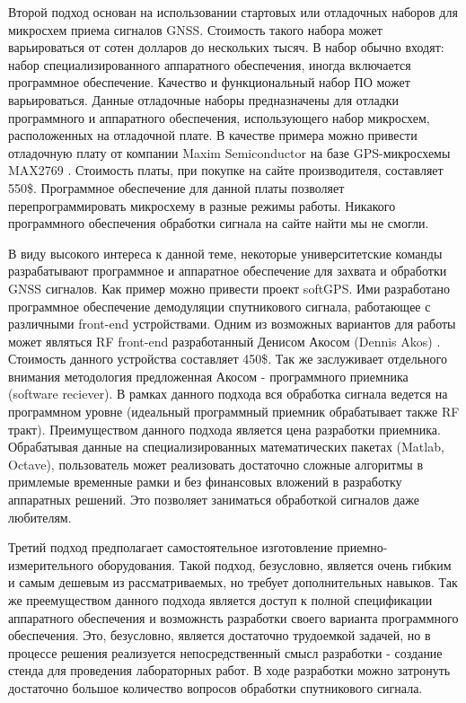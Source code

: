 \documentclass[a4paper,12pt]{article}
\numberwithin{table}{section}
\begin{document}
Второй подход основан на использовании стартовых или отладочных наборов для микросхем приема сигналов GNSS.
Стоимость такого набора может варьироваться от сотен долларов до нескольких тысяч.
В набор обычно входят: набор специализированного аппаратного обеспечения, иногда включается программное обеспечение.
Качество и функциональный набор ПО может варьироваться.
Данные отладочные наборы предназначены для отладки программного и аппаратного обеспечения, использующего набор
микросхем, расположенных на отладочной плате.
В качестве примера можно привести отладочную плату от компании Maxim Semiconductor на базе GPS-микросхемы MAX2769 \cite{max-evkit}.
Стоимость платы, при покупке на сайте производителя, составляет 550\$.
Программное обеспечение для данной платы позволяет перепрограммировать микросхему в разные режимы работы.
Никакого программного обеспечения обработки сигнала на сайте найти мы не смогли.

В виду высокого интереса к данной теме, некоторые университетские команды разрабатывают программное и аппаратное обеспечение
для захвата и обработки GNSS сигналов.
Как пример можно привести проект softGPS.
Ими разработано программное обеспечение демодуляции спутникового сигнала, работающее с различными front-end устройствами.
Одним из возможных вариантов для работы может являться RF front-end разработанный Денисом Акосом (Dennis Akos) \cite{akos-frontend}.
Стоимость данного устройства составляет 450\$.
Так же заслуживает отдельного внимания методология предложенная Акосом - программного приемника (software reciever).
В рамках данного подхода вся обработка сигнала ведется на программном уровне (идеальный программный приемник обрабатывает также RF тракт).
Преимуществом данного подхода является цена разработки приемника.
Обрабатывая данные на специализированных математических пакетах (Matlab, Octave), пользователь может реализовать достаточно сложные алгоритмы в примлемые
временные рамки и без финансовых вложений в разработку аппаратных решений. Это позволяет заниматься обработкой сигналов даже любителям.

Третий подход предполагает самостоятельное изготовление приемно-измерительного оборудования.
Такой подход, безусловно, является очень гибким и самым дешевым из рассматриваемых, но требует дополнительных навыков.
Так же преемуществом данного подхода является доступ к полной спецификации аппаратного обеспечения и возможнсть
разработки своего варианта программного обеспечения.
Это, безусловно, является достаточно трудоемкой задачей, но в процессе решения реализуется непосредственный
смысл разработки - создание стенда для проведения лабораторных работ.
В ходе разработки можно затронуть достаточно большое количество вопросов обработки спутникового сигнала. 
\end{document}
